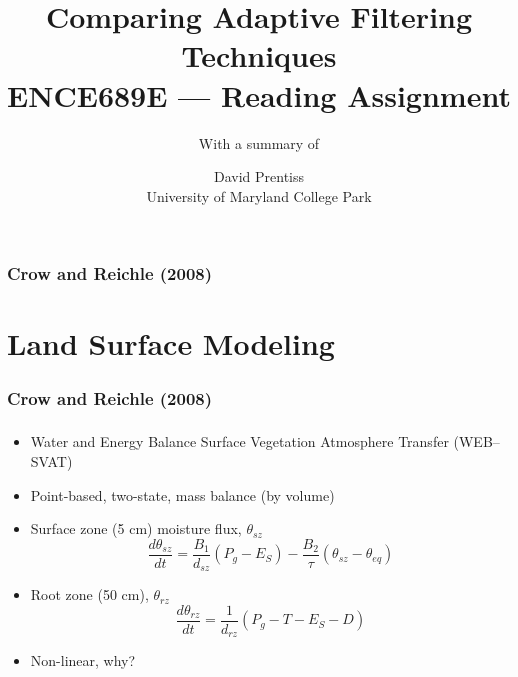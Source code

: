 \documentclass[mathserif]{beamer}
\begin{document}
\nobibliography*
\title{Comparing Adaptive Filtering Techniques \\ ENCE689E --- Reading Assignment}
\author{David Prentiss \\ University of Maryland College Park}
\subtitle{With a summary of \\ }

\frame{\titlepage}

\begin{frame}
  \frametitle{Crow and Reichle (2008)}
  \tableofcontents
\end{frame}

\section{Land Surface Modeling}

\begin{frame}
  \frametitle{Crow and Reichle (2008)}
  \tableofcontents[currentsection]
\end{frame}

\begin{frame}
  \frametitle{\insertsection}
  \begin{itemize}
    \item Water and Energy Balance Surface Vegetation Atmosphere Transfer (WEB--SVAT)
    \item Point-based, two-state, mass balance (by volume)
    \item Surface zone (5 cm) moisture flux, $\theta_{sz}$
      \begin{equation}
        \frac{d\theta_{sz}}{dt}=\frac{B_1}{d_{sz}}\left(P_g - E_S\right)-\frac{B_2}{\tau}\left(\theta_{sz}-\theta_{eq}\right)
      \end{equation}
    \item Root zone (50 cm), $\theta_{rz}$
      \begin{equation}
        \frac{d\theta_{rz}}{dt}=\frac{1}{d_{rz}}\left(P_g - T - E_S - D\right)
      \end{equation}
    \item Non-linear, why?
  \end{itemize}
\end{frame}
\end{document}
